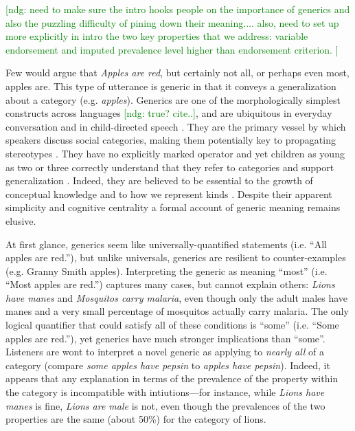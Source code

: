 \documentclass[10pt,letterpaper]{article}
\newcommand{\ndg}[1]{\textcolor{Green}{[ndg: #1]}}
\begin{document}
\ndg{need to make sure the intro hooks people on the importance of generics and also the puzzling difficulty of pining down their meaning.... also, need to set up more explicitly in intro the two key properties that we address: variable endorsement and imputed prevalence level higher than endorsement criterion. }


Few would argue that \emph{Apples are red}, but certainly not all, or perhaps even most, apples are.
This type of utterance is generic \cite{Carlson1977, Leslie2008} in that it conveys a generalization about a category (e.g. \emph{apples}).  
Generics are one of the morphologically simplest constructs across languages \ndg{true? cite..}, and are ubiquitous in everyday conversation and in child-directed speech \cite{Gelman2008}.
They are the primary vessel by which speakers discuss social categories, making them potentially key to propagating stereotypes \cite{GelmanEtAl2004, Cimpian2010motivation, Leslie2015}.
They have no explicitly marked operator and yet children as young as two or three correctly understand that they refer to categories and support generalization \cite{Cimpian2008}. 
Indeed, they are believed to be essential to the growth of conceptual knowledge \cite{Gelman2004} and to how we represent kinds \cite{Leslie2008}.
Despite their apparent simplicity and cognitive centrality a formal account of generic meaning remains elusive.

At first glance, generics seem like universally-quantified statements (i.e. ``All apples are red.''), but unlike universals, generics are resilient to counter-examples (e.g. Granny Smith apples). 
Interpreting the generic as meaning ``most'' (i.e. ``Most apples are red.'') captures many cases, but cannot explain others: \emph{Lions have manes} and \emph{Mosquitos carry malaria}, even though only the adult males have manes and a very small percentage of mosquitos actually carry malaria.
The only logical quantifier that could satisfy all of these conditions is ``some'' (i.e. ``Some apples are red.''), yet generics have much stronger implications than ``some''. 
Listeners are wont to interpret a novel generic as applying to \emph{nearly all} of a category \cite{Gelman2002, Cimpian2010} (compare \emph{some apples have pepsin} to \emph{apples have pepsin}).
Indeed, it appears that any explanation in terms of the prevalence of the property within the category is incompatible with intiutions---for instance, while \emph{Lions have manes} is fine, \emph{Lions are male} is not, even though the prevalences of the two properties are the same (about 50\%) for the category of lions.
\end{document}
